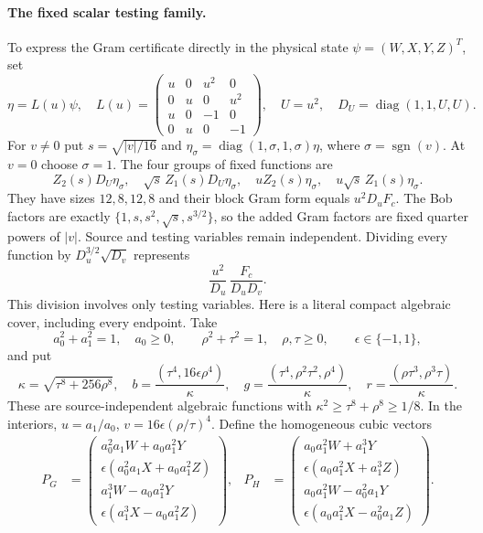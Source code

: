 \documentclass[10pt]{article}
\newcommand{\diag}{\operatorname{diag}}
\newcommand{\sgn}{\operatorname{sgn}}
\begin{document}
\paragraph{The fixed scalar testing family.}
To express the Gram certificate directly in the physical state
$\psi=(W,X,Y,Z)^T$, set
\[
\eta=L(u)\psi,
\quad
L(u)=\begin{pmatrix}u&0&u^2&0\\0&u&0&u^2\\u&0&-1&0\\0&u&0&-1\end{pmatrix},
\quad U=u^2,\quad D_U=\diag(1,1,U,U).
\]
For $v\ne0$ put $s=\sqrt{|v|/16}$ and
$\eta_\sigma=\diag(1,\sigma,1,\sigma)\eta$, where $\sigma=\sgn(v)$.
At $v=0$ choose $\sigma=1$. The four groups of fixed functions are
\begin{equation}
\boxed{
Z_2(s)D_U\eta_\sigma,\quad
\sqrt{s}\,Z_1(s)D_U\eta_\sigma,\quad
uZ_2(s)\eta_\sigma,\quad
u\sqrt{s}\,Z_1(s)\eta_\sigma.}                            \label{eq:features}
\end{equation}
They have sizes $12,8,12,8$ and their block Gram form equals $u^2D_uF_c$.
The Bob factors are exactly
$\{1,s,s^2,\sqrt{s},s^{3/2}\}$, so the added Gram factors are fixed quarter
powers of $|v|$. Source and testing variables remain independent.
Dividing every function by $D_u^{3/2}\sqrt{D_v}$ represents
\begin{equation}
\frac{u^2}{D_u}\,\frac{F_c}{D_uD_v}.                       \label{eq:normalized}
\end{equation}
This division involves only testing variables. Here is a literal compact
algebraic cover, including every endpoint. Take
\[
a_0^2+a_1^2=1,\quad a_0\geq0,\qquad
\rho^2+\tau^2=1,\quad\rho,\tau\geq0,\qquad\epsilon\in\{-1,1\},
\]
and put
\[
\kappa=\sqrt{\tau^8+256\rho^8},\quad
b=\frac{(\tau^4,16\epsilon\rho^4)}{\kappa},\quad
g=\frac{(\tau^4,\rho^2\tau^2,\rho^4)}{\kappa},\quad
r=\frac{(\rho\tau^3,\rho^3\tau)}{\kappa}.
\]
These are source-independent algebraic functions with
$\kappa^2\geq\tau^8+\rho^8\geq1/8$.
In the interiors, $u=a_1/a_0$, $v=16\epsilon(\rho/\tau)^4$.
Define the homogeneous cubic vectors
\begin{align*}
P_G&=\left(\begin{smallmatrix}
a_0^2a_1W+a_0a_1^2Y\\
\epsilon(a_0^2a_1X+a_0a_1^2Z)\\
a_1^3W-a_0a_1^2Y\\
\epsilon(a_1^3X-a_0a_1^2Z)
\end{smallmatrix}\right),&
P_H&=\left(\begin{smallmatrix}
a_0a_1^2W+a_1^3Y\\
\epsilon(a_0a_1^2X+a_1^3Z)\\
a_0a_1^2W-a_0^2a_1Y\\
\epsilon(a_0a_1^2X-a_0^2a_1Z)
\end{smallmatrix}\right).
\end{align*}
\end{document}
